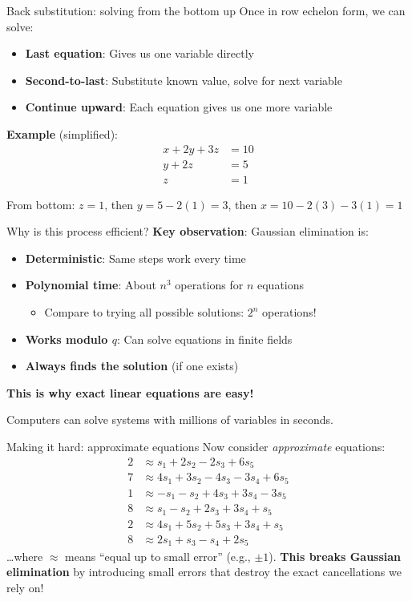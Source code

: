 \documentclass[aspectratio=169, lualatex, handout]{beamer}
\begin{document}
\begin{frame}{Back substitution: solving from the bottom up}
	Once in row echelon form, we can solve:
	\begin{itemize}
		\item \textbf{Last equation}: Gives us one variable directly
		\item \textbf{Second-to-last}: Substitute known value, solve for next variable
		\item \textbf{Continue upward}: Each equation gives us one more variable
	\end{itemize}

	\textbf{Example} (simplified):
	\begin{align*}
		x + 2y + 3z & = 10 \\
		y + 2z      & = 5  \\
		z           & = 1
	\end{align*}

	From bottom: $z = 1$, then $y = 5 - 2(1) = 3$, then $x = 10 - 2(3) - 3(1) = 1$
\end{frame}

\begin{frame}{Why is this process efficient?}
	\textbf{Key observation}: Gaussian elimination is:
	\begin{itemize}
		\item \textbf{Deterministic}: Same steps work every time
		\item \textbf{Polynomial time}: About $n^3$ operations for $n$ equations
		      \begin{itemize}
			      \item Compare to trying all possible solutions: $2^n$ operations!
		      \end{itemize}
		\item \textbf{Works modulo $q$}: Can solve equations in finite fields
		\item \textbf{Always finds the solution} (if one exists)
	\end{itemize}

	\textbf{This is why exact linear equations are easy!}

	Computers can solve systems with millions of variables in seconds.
\end{frame}

\begin{frame}{Making it hard: approximate equations}
	Now consider \textit{approximate} equations:
	\begin{align*}
		2 & \approx s_1 + 2s_2 - 2s_3 + 6s_5         \\
		7 & \approx 4s_1 + 3s_2 - 4s_3 - 3s_4 + 6s_5 \\
		1 & \approx -s_1 - s_2 + 4s_3 + 3s_4 - 3s_5  \\
		8 & \approx s_1 - s_2 + 2s_3 + 3s_4 + s_5    \\
		2 & \approx 4s_1 + 5s_2 + 5s_3 + 3s_4 + s_5  \\
		8 & \approx 2s_1 + s_3 - s_4 + 2s_5
	\end{align*}
	\ldots where $\approx$ means ``equal up to small error'' (e.g., $\pm 1$). \textbf{This breaks Gaussian elimination} by introducing small errors that destroy the exact cancellations we rely on!
\end{frame}
\end{document}
